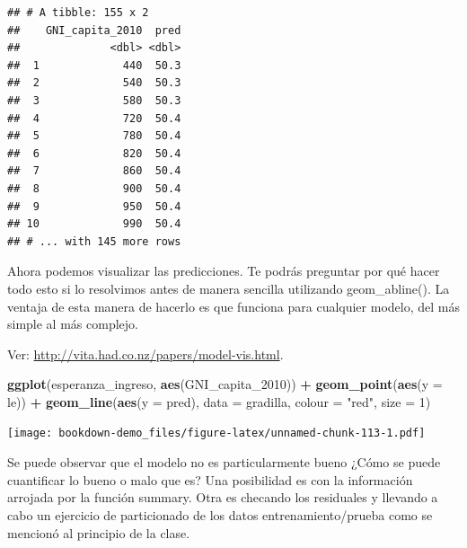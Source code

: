 \documentclass[]{book}
\newenvironment{Shaded}{\begin{snugshade}}{\end{snugshade}}
\newcommand{\KeywordTok}[1]{\textcolor[rgb]{0.13,0.29,0.53}{\textbf{#1}}}
\newcommand{\DataTypeTok}[1]{\textcolor[rgb]{0.13,0.29,0.53}{#1}}
\newcommand{\DecValTok}[1]{\textcolor[rgb]{0.00,0.00,0.81}{#1}}
\newcommand{\StringTok}[1]{\textcolor[rgb]{0.31,0.60,0.02}{#1}}
\newcommand{\OperatorTok}[1]{\textcolor[rgb]{0.81,0.36,0.00}{\textbf{#1}}}
\newcommand{\NormalTok}[1]{#1}
\theoremstyle{definition}
\theoremstyle{definition}
\theoremstyle{definition}
\theoremstyle{remark}
\begin{document}
\begin{Shaded}
\end{Shaded}

\begin{verbatim}
## # A tibble: 155 x 2
##    GNI_capita_2010  pred
##              <dbl> <dbl>
##  1             440  50.3
##  2             540  50.3
##  3             580  50.3
##  4             720  50.4
##  5             780  50.4
##  6             820  50.4
##  7             860  50.4
##  8             900  50.4
##  9             950  50.4
## 10             990  50.4
## # ... with 145 more rows
\end{verbatim}

Ahora podemos visualizar las predicciones. Te podrás preguntar por qué
hacer todo esto si lo resolvimos antes de manera sencilla utilizando
geom\_abline(). La ventaja de esta manera de hacerlo es que funciona
para cualquier modelo, del más simple al más complejo.

Ver: \url{http://vita.had.co.nz/papers/model-vis.html}.

\begin{Shaded}
\begin{Highlighting}[]
\KeywordTok{ggplot}\NormalTok{(esperanza_ingreso, }\KeywordTok{aes}\NormalTok{(GNI_capita_}\DecValTok{2010}\NormalTok{)) }\OperatorTok{+}
\StringTok{  }\KeywordTok{geom_point}\NormalTok{(}\KeywordTok{aes}\NormalTok{(}\DataTypeTok{y =}\NormalTok{ le)) }\OperatorTok{+}
\StringTok{  }\KeywordTok{geom_line}\NormalTok{(}\KeywordTok{aes}\NormalTok{(}\DataTypeTok{y =}\NormalTok{ pred), }\DataTypeTok{data =}\NormalTok{ gradilla, }\DataTypeTok{colour =} \StringTok{"red"}\NormalTok{, }\DataTypeTok{size =} \DecValTok{1}\NormalTok{)}
\end{Highlighting}
\end{Shaded}

\texttt{[image: bookdown-demo\_files/figure-latex/unnamed-chunk-113-1.pdf]}

Se puede observar que el modelo no es particularmente bueno ¿Cómo se
puede cuantificar lo bueno o malo que es? Una posibilidad es con la
información arrojada por la función summary. Otra es checando los
residuales y llevando a cabo un ejercicio de particionado de los datos
entrenamiento/prueba como se mencionó al principio de la clase.
\end{document}
